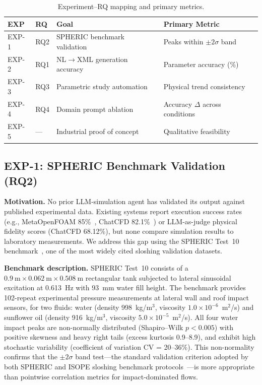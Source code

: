 \documentclass[11pt]{article}
\begin{document}
\begin{table}[htbp]
\centering
\caption{Experiment--RQ mapping and primary metrics.}
\label{tab:exp_rq}
\small
\begin{tabular}{@{}lllp{3.5cm}@{}}
\toprule
\textbf{EXP} & \textbf{RQ} & \textbf{Goal} & \textbf{Primary Metric} \\
\midrule
EXP-1 & RQ2 & SPHERIC benchmark validation & Peaks within $\pm 2\sigma$ band \\
EXP-2 & RQ1 & NL$\rightarrow$XML generation accuracy & Parameter accuracy (\%) \\
EXP-3 & RQ3 & Parametric study automation & Physical trend consistency \\
EXP-4 & RQ4 & Domain prompt ablation & Accuracy $\Delta$ across conditions \\
EXP-5 & --- & Industrial proof of concept & Qualitative feasibility \\
\bottomrule
\end{tabular}
\end{table}

\subsection{EXP-1: SPHERIC Benchmark Validation (RQ2)}

\textbf{Motivation.} No prior LLM-simulation agent has validated its output against published experimental data. Existing systems report execution success rates (e.g., MetaOpenFOAM 85\%~\citep{metaopenfoam2024}, ChatCFD 82.1\%~\citep{chatcfd2026}) or LLM-as-judge physical fidelity scores (ChatCFD 68.12\%), but none compare simulation results to laboratory measurements. We address this gap using the SPHERIC Test~10 benchmark~\citep{spheric2009}, one of the most widely cited sloshing validation datasets.

\textbf{Benchmark description.} SPHERIC Test~10 consists of a $0.9~\text{m} \times 0.062~\text{m} \times 0.508~\text{m}$ rectangular tank subjected to lateral sinusoidal excitation at 0.613~Hz with 93~mm water fill height. The benchmark provides 102-repeat experimental pressure measurements at lateral wall and roof impact sensors, for two fluids: water (density 998~kg/m$^3$, viscosity $1.0 \times 10^{-6}$~m$^2$/s) and sunflower oil (density 916~kg/m$^3$, viscosity $5.0 \times 10^{-5}$~m$^2$/s). All four water impact peaks are non-normally distributed (Shapiro--Wilk $p < 0.005$) with positive skewness and heavy right tails (excess kurtosis 0.9--8.9), and exhibit high stochastic variability (coefficient of variation CV = 20--36\%). This non-normality confirms that the $\pm 2\sigma$ band test---the standard validation criterion adopted by both SPHERIC and ISOPE sloshing benchmark protocols~\citep{isope2012sloshing}---is more appropriate than pointwise correlation metrics for impact-dominated flows.
\end{document}
